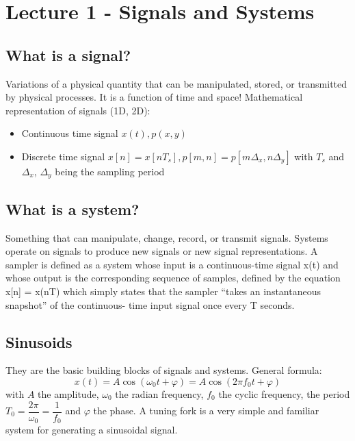 %
%
%
%
%

\section{Lecture 1 - Signals and Systems}
\subsection{What is a signal?}
Variations of a physical quantity that can be manipulated, stored, or transmitted by physical processes. It is a function of time and space!
\newline Mathematical representation of signals (1D, 2D):
\begin{itemize}
	\item Continuous time signal $x(t), p(x,y)$
	\item Discrete time signal $x[n] = x[nT_s], p[m,n] = p[m\Delta_x ,n\Delta_y] $ with $T_s$ and $\Delta_x$, $\Delta_y$ being the sampling period
\end{itemize}
\subsection{What is a system?}
Something that can manipulate, change, record, or transmit signals. Systems operate on signals to produce new signals or new signal representations.
\newline A sampler is defined as a system whose input is a continuous-time signal x(t) and whose output is the corresponding sequence of samples, defined by the equation x[n] = x(nT) which simply states that the sampler “takes an instantaneous snapshot” of the continuous- time input signal once every T seconds.
\subsection{Sinusoids}
They are the basic building blocks of signals and systems. General formula:
\begin{equation}
	x(t)=A \cos(\omega_0 t+\varphi)=A \cos(2\pi f_0 t+\varphi)
\end{equation}
with $A$ the amplitude, $\omega_0$ the radian frequency, $f_0$ the cyclic frequency, the period $T_0 = \dfrac{2 \pi}{\omega_0} = \dfrac{1}{f_0}$ and $\varphi$ the phase.
\newline A tuning fork is a very simple and familiar system for generating a sinusoidal signal.
